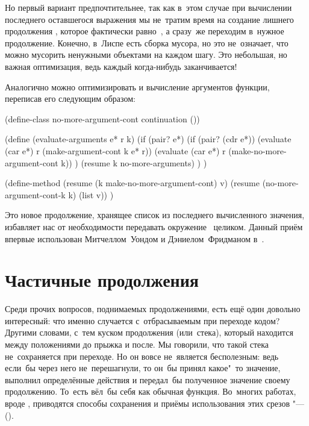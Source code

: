Но первый вариант предпочтительнее, так как в~этом случае при вычислении
последнего оставшегося выражения мы не~тратим время на создание лишнего
продолжения , которое фактически равно~, а
сразу~же переходим в~нужное продолжение. Конечно, в~Лиспе есть сборка мусора, но
это не~означает, что можно мусорить ненужными объектами на каждом шагу. Это
небольшая, но важная оптимизация, ведь каждый  когда-нибудь
заканчивается!

Аналогично можно оптимизировать и вычисление аргументов функции, переписав его
следующим образом:

\begin{code:lisp}
(define-class no-more-argument-cont continuation ())

(define (evaluate-arguments e* r k)
  (if (pair? e*)
      (if (pair? (cdr e*))
          (evaluate (car e*) r (make-argument-cont k e* r))
          (evaluate (car e*) r (make-no-more-argument-cont k)) )
      (resume k no-more-arguments) ) )

(define-method (resume (k make-no-more-argument-cont) v)
  (resume (no-more-argument-cont-k k) (list v)) )
\end{code:lisp}

Это новое продолжение, хранящее список из последнего вычисленного значения,
избавляет нас от необходимости передавать окружение~ целиком. Данный приём
впервые использован Митчеллом~Уондом и Дэниелом~Фридманом в~\cite{wan80b}.


\section{Частичные продолжения}\label{escape/sect:partial}

Среди прочих вопросов, поднимаемых продолжениями, есть ещё один довольно
интересный: что именно случается с~отбрасываемым при переходе кодом? Другими
словами, с~тем куском продолжения (или~стека), который находится между
положениями до прыжка и после. Мы говорили, что такой  стека
не~сохраняется при переходе. Но он вовсе не~является бесполезным: ведь если~бы
через него не~перешагнули, то он~бы принял какое"~то значение, выполнил
определённые действия и передал~бы полученное значение своему продолжению.
То~есть вёл~бы себя как обычная функция. Во~многих работах, вроде
\cite{ffdm87,ff87,fel88,df90,hd90,qs91,mq94}, приводятся способы сохранения и
приёмы использования этих срезов "--- 
().

